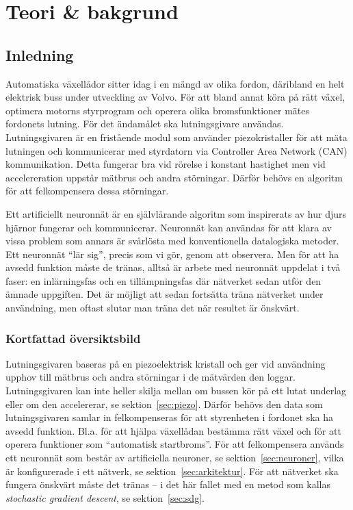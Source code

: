 \section{Teori \& bakgrund}
\subsection{Inledning}
Automatiska växellådor sitter idag i en mängd av olika fordon,
däribland en helt elektrisk buss under utveckling av Volvo.
För att bland annat köra på rätt växel, optimera motorns styrprogram
och operera olika bromsfunktioner %
mätes fordonets lutning.
För det ändamålet ska lutningsgivare användas.
Lutningsgivaren är en fristående modul som använder piezokristaller för att
mäta lutningen och kommunicerar med styrdatorn
via Controller Area Network (CAN) kommunikation.
Detta fungerar bra vid rörelse i konstant hastighet
men vid accelereration uppstår mätbrus och andra störningar.
Därför behövs en algoritm för att felkompensera dessa störningar.

Ett artificiellt neuronnät är en självlärande algoritm som inspirerats av
hur djurs hjärnor fungerar och kommunicerar.
Neuronnät kan användas för att klara av vissa problem som annars är svårlösta
med konventionella datalogiska metoder.
Ett neuronnät ``lär sig'', precis som vi gör, genom att observera.
Men för att ha avsedd funktion måste de tränas, alltså är arbete med neuronnät
uppdelat i två faser: en inlärningsfas och en tillämpningsfas där nätverket sedan
utför den ämnade uppgiften.
\autocite{copeland16}
Det är möjligt att sedan fortsätta träna nätverket
under användning, men oftast slutar man träna det när resultet är önskvärt.
\autocite{wiki-neuronnat}

\subsubsection{Kortfattad översiktsbild}
Lutningsgivaren baseras på en piezoelektrisk kristall och ger vid användning
upphov till mätbrus och andra störningar i de mätvärden den loggar.
Lutningsgivaren kan inte heller skilja mellan om bussen kör på ett lutat underlag
eller om den accelererar, se sektion~\ref{sec:piezo}.
Därför behövs den data som lutningsgivaren samlar in felkompenseras för att
styrenheten i fordonet ska ha avsedd funktion. Bl.a. för att hjälpa växellådan
bestämma rätt växel och för att operera funktioner som ``automatisk startbroms''.
För att felkompensera används ett neuronnät som består av artificiella
neuroner, se sektion~\ref{sec:neuroner}, vilka är konfigurerade i ett nätverk,
se sektion~\ref{sec:arkitektur}. För att nätverket ska fungera önskvärt måste
det tränas -- i det här fallet med en metod som kallas \emph{stochastic gradient descent},
se sektion~\ref{sec:sdg}.

